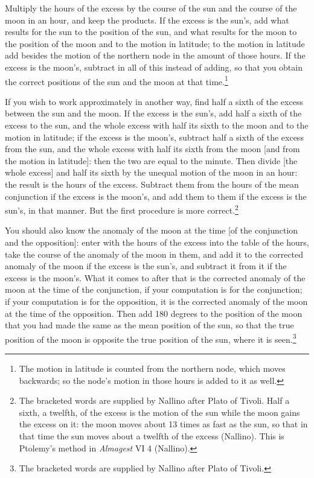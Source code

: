 \documentclass[11pt]{article}
\newcommand{\ArPage}[1]{\marginpar{\footnotesize\color{gray}Ar.\,p.\,#1}}
\begin{document}
\par Multiply the hours of the excess by the course of the sun and the course of the moon in an hour, and keep the products. If the excess is the sun's, add what results for the sun to the position of the sun, and what results for the moon to the position of the moon and to the motion in latitude; to the motion in latitude add besides the motion of the northern node in the amount of those hours. If the excess is the moon's, subtract in all of this instead of adding, so that you obtain the correct positions of the sun and the moon at that time.\footnote{The motion in latitude is counted from the northern node, which moves backwards; so the node's motion in those hours is added to it as well.}\par
\par If you wish to work approximately in another way, find half a sixth of the excess between the sun and the moon. If the excess is the sun's, add half a sixth of the excess to the sun, and the whole excess with half its sixth to the moon and to the motion in latitude; if the excess is the moon's, subtract half a sixth of the excess from the sun, and the whole excess with half its sixth from the moon [and from the motion in latitude]: then the two are equal to the minute. Then divide [the whole excess] and half its sixth by the unequal motion of the moon in an hour: the result is the hours of the excess. Subtract them from the hours of the mean conjunction if the excess is the moon's, and add them to them if the excess is the sun's, in that manner. But the first procedure is more correct.\footnote{The bracketed words are supplied by Nallino after Plato of Tivoli. Half a sixth, a twelfth, of the excess is the motion of the sun while the moon gains the excess on it: the moon moves about 13 times as fast as the sun, so that in that time the sun moves about a twelfth of the excess (Nallino). This is Ptolemy's method in \emph{Almagest} VI 4 (Nallino).}\par
\par \ArPage{143}You should also know the anomaly of the moon at the time [of the conjunction and the opposition]: enter with the hours of the excess into the table of the hours, take the course of the anomaly of the moon in them, and add it to the corrected anomaly of the moon if the excess is the sun's, and subtract it from it if the excess is the moon's. What it comes to after that is the corrected anomaly of the moon at the time of the conjunction, if your computation is for the conjunction; if your computation is for the opposition, it is the corrected anomaly of the moon at the time of the opposition. Then add 180 degrees to the position of the moon that you had made the same as the mean position of the sun, so that the true position of the moon is opposite the true position of the sun, where it is seen.\footnote{The bracketed words are supplied by Nallino after Plato of Tivoli.}\par
\end{document}
